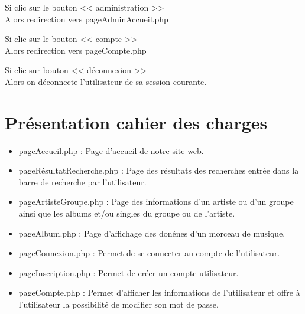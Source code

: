 		\begin{paragraphe}
			Si clic sur le bouton << administration >> \\
			Alors redirection vers pageAdminAccueil.php
		\end{paragraphe}

		\begin{paragraphe}
			Si clic sur le bouton << compte >> \\
			Alors redirection vers pageCompte.php
		\end{paragraphe}
		
		\begin{paragraphe}
			Si clic sur bouton << déconnexion >> \\
			Alors on déconnecte l'utilisateur de sa session courante.
		\end{paragraphe}


\newpage

\section{Présentation cahier des charges}

	\begin{paragraphe}
		\begin{itemize}
			\item pageAccueil.php : Page d'accueil de notre site web.
			\item pageRésultatRecherche.php : Page des résultats des recherches entrée dans la barre de recherche par l'utilisateur.
			\item pageArtisteGroupe.php : Page des informations d'un artiste ou d'un groupe ainsi que les albums et/ou singles du groupe ou de l'artiste.
			\item pageAlbum.php : Page d'affichage des donénes d'un morceau de musique.
		\end{itemize}
	\end{paragraphe}

	\begin{paragraphe}
		\begin{itemize}
			\item pageConnexion.php : Permet de se connecter au compte de l'utilisateur.
			\item pageInscription.php : Permet de créer un compte utilisateur.
			\item pageCompte.php : Permet d'afficher les informations de l'utilisateur et offre à l'utilisateur la possibilité de modifier son mot de passe.
		\end{itemize}
	\end{paragraphe}

